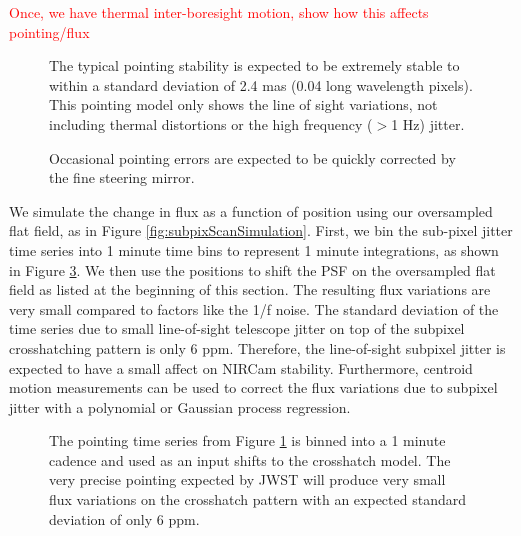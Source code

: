 \documentclass{aastex62}
\begin{document}
\textcolor{red}{Once, we have thermal inter-boresight motion, show how this affects pointing/flux}

\begin{figure}
\caption{The typical pointing stability is expected to be extremely stable to within a standard deviation of 2.4 mas (0.04 long wavelength pixels).
This pointing model only shows the line of sight variations, not including thermal distortions or the high frequency ($>$1 Hz) jitter.
}\label{fig:tserPointingFull}
\end{figure}

\begin{figure}
\caption{Occasional pointing errors are expected to be quickly corrected by the fine steering mirror.
}\label{fig:tserPointingZoom}
\end{figure}

We simulate the change in flux as a function of position using our oversampled flat field, as in Figure \ref{fig:subpixScanSimulation}.
First, we bin the sub-pixel jitter time series into 1 minute time bins to represent 1 minute integrations, as shown in Figure \ref{fig:tserPointingAndFlux}.
We then use the positions to shift the PSF on the oversampled flat field as listed at the beginning of this section.
The resulting flux variations are very small compared to factors like the 1/f noise.
The standard deviation of the time series due to small line-of-sight telescope jitter on top of the subpixel crosshatching pattern is only 6 ppm.
Therefore, the line-of-sight subpixel jitter is expected to have a small affect on NIRCam stability.
Furthermore, centroid motion measurements can be used to correct the flux variations due to subpixel jitter with a polynomial or Gaussian process regression.

\begin{figure}
\caption{The pointing time series from Figure \ref{fig:tserPointingFull} is binned into a 1 minute cadence and used as an input shifts to the crosshatch model.
The very precise pointing expected by JWST will produce very small flux variations on the crosshatch pattern with an expected standard deviation of only 6 ppm.
}\label{fig:tserPointingAndFlux}
\end{figure}
\end{document}
